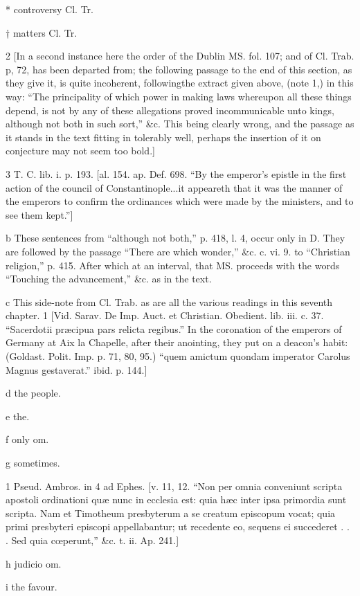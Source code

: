 *
controversy Cl. Tr.

†
matters Cl. Tr.

2
[In a second instance here the order of the Dublin MS. fol. 107; and of Cl. Trab. p, 72, has been departed from; the following passage to the end of this section, as they give it, is quite incoherent, followingthe extract given above, (note 1,) in this way: “The principality of which power in making laws whereupon all these things depend, is not by any of these allegations proved incommunicable unto kings, although not both in such sort,” &c. This being clearly wrong, and the passage as it stands in the text fitting in tolerably well, perhaps the insertion of it on conjecture may not seem too bold.]

3
T. C. lib. i. p. 193. [al. 154. ap. Def. 698. “By the emperor’s epistle in the first action of the council of Constantinople...it appeareth that it was the manner of the emperors to confirm the ordinances which were made by the ministers, and to see them kept.”]

b
These sentences from “although not both,” p. 418, l. 4, occur only in D. They are followed by the passage “There are which wonder,” &c. c. vi. 9. to “Christian religion,” p. 415. After which at an interval, that MS. proceeds with the words “Touching the advancement,” &c. as in the text.

c This side-note from Cl. Trab. as are all the various readings in this seventh chapter.
1
[Vid. Sarav. De Imp. Auct. et Christian. Obedient. lib. iii. c. 37. “Sacerdotii præcipua pars relicta regibus.” In the coronation of the emperors of Germany at Aix la Chapelle, after their anointing, they put on a deacon’s habit: (Goldast. Polit. Imp. p. 71, 80, 95.) “quem amictum quondam imperator Carolus Magnus gestaverat.” ibid. p. 144.]

d
the people.

e
the.

f
only om.

g
sometimes.

1
Pseud. Ambros. in 4 ad Ephes. [v. 11, 12. “Non per omnia conveniunt scripta apostoli ordinationi quæ nunc in ecclesia est: quia hæc inter ipsa primordia sunt scripta. Nam et Timotheum presbyterum a se creatum episcopum vocat; quia primi presbyteri episcopi appellabantur; ut recedente eo, sequens ei succederet . . . Sed quia cœperunt,” &c. t. ii. Ap. 241.]

h
judicio om.

i
the favour.

